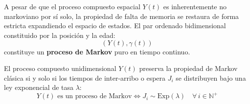 \begin{prop}
A pesar de que el proceso compuesto espacial $Y(t)$ es inherentemente no markoviano por sí solo, la propiedad de falta de memoria se restaura de forma estricta expandiendo el espacio de estados. El par ordenado bidimensional constituido por la posición y la edad:
\[
(Y(t), \gamma(t))
\]
constituye un \textbf{proceso de Markov} puro en tiempo continuo.
\end{prop}

\begin{prop}
El proceso compuesto unidimensional $Y(t)$ preserva la propiedad de Markov clásica si y solo si los tiempos de inter-arribo o espera $J_i$ se distribuyen bajo una ley exponencial de tasa $\lambda$:
\[
Y(t) \text{ es un proceso de Markov} \iff J_i \sim \text{Exp}(\lambda) \quad \forall \, i \in \mathbb{N}^+
\]
\end{prop}








